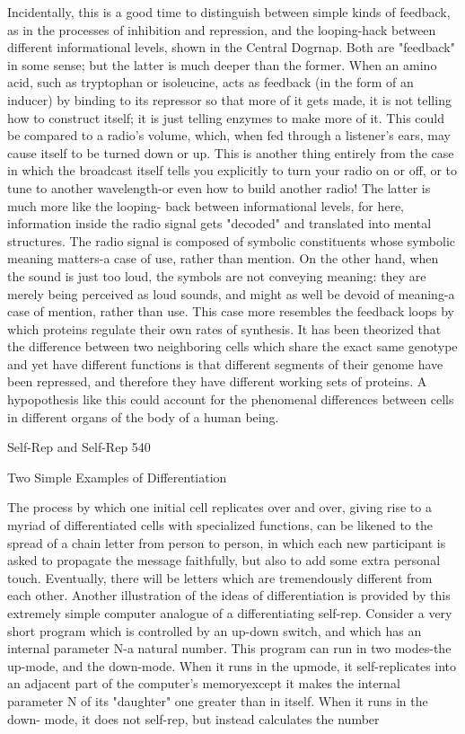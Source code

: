 {Incidentally, this is a good time to distinguish between simple kinds of feedback, as in the
processes of inhibition and repression, and the looping-hack between different informational
levels, shown in the Central Dogrnap. Both are "feedback" in some sense; but the latter is
much deeper than the former. When an amino acid, such as tryptophan or isoleucine, acts as
feedback (in the form of an inducer) by binding to its repressor so that more of it gets made,
it is not telling how to construct itself; it is just telling enzymes to make more of it. This
could be compared to a radio's volume, which, when fed through a listener's ears, may cause
itself to be turned down or up. This is another thing entirely from the case in which the
broadcast itself tells you explicitly to turn your radio on or off, or to tune to another
wavelength-or even how to build another radio! The latter is much more like the looping-
back between informational levels, for here, information inside the radio signal gets
"decoded" and translated into mental structures. The radio signal is composed of symbolic
constituents whose symbolic meaning matters-a case of use, rather than mention. On the
other hand, when the sound is just too loud, the symbols are not conveying meaning: they are
merely being perceived as loud sounds, and might as well be devoid of meaning-a case of
mention, rather than use. This case more resembles the feedback loops by which proteins
regulate their own rates of synthesis.
         It has been theorized that the difference between two neighboring cells which share
the exact same genotype and yet have different functions is that different segments of their
genome have been repressed, and therefore they have different working sets of proteins. A
hypopothesis like this could account for the phenomenal differences between cells in
different organs of the body of a human being.




Self-Rep and Self-Rep                                                                     540

                          Two Simple Examples of Differentiation

The process by which one initial cell replicates over and over, giving rise to a myriad of
differentiated cells with specialized functions, can be likened to the spread of a chain letter
from person to person, in which each new participant is asked to propagate the message
faithfully, but also to add some extra personal touch. Eventually, there will be letters which
are tremendously different from each other.
         Another illustration of the ideas of differentiation is provided by this extremely
simple computer analogue of a differentiating self-rep. Consider a very short program which
is controlled by an up-down switch, and which has an internal parameter N-a natural number.
This program can run in two modes-the up-mode, and the down-mode. When it runs in the
upmode, it self-replicates into an adjacent part of the computer's memoryexcept it makes the
internal parameter N of its "daughter" one greater than in itself. When it runs in the down-
mode, it does not self-rep, but instead calculates the number

}
